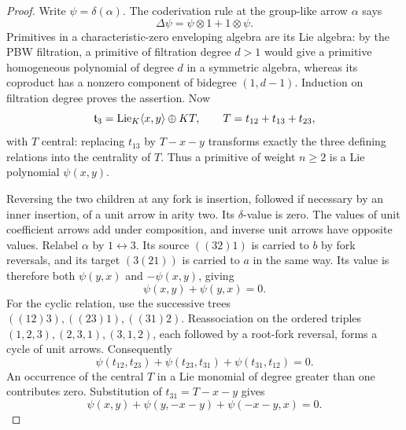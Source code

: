 \begin{proof}
Write $\psi=\delta(\alpha)$.  The coderivation rule at the group-like
arrow $\alpha$ says
\[
 \Delta\psi=\psi\otimes1+1\otimes\psi.
\]
Primitives in a characteristic-zero enveloping algebra are its Lie
algebra: by the PBW filtration, a primitive of filtration degree
$d>1$ would give a primitive homogeneous polynomial of degree $d$ in a
symmetric algebra, whereas its coproduct has a nonzero component of
bidegree $(1,d-1)$.  Induction on filtration degree proves the assertion.
Now
\begin{equation}\label{eq:category-three-split}
 \mathfrak t_3=\operatorname{Lie}_K\langle x,y\rangle\oplus K T,
 \qquad T=t_{12}+t_{13}+t_{23},
\end{equation}
with $T$ central: replacing $t_{13}$ by $T-x-y$ transforms exactly the
three defining relations into the centrality of $T$.  Thus a primitive
of weight $n\geq2$ is a Lie polynomial $\psi(x,y)$.

Reversing the two children at any fork is insertion, followed if
necessary by an inner insertion, of a unit arrow in arity two.  Its
$\delta$-value is zero.  The values of unit coefficient arrows add under
composition, and inverse unit arrows have opposite values.  Relabel
$\alpha$ by $1\leftrightarrow3$.  Its source $((32)1)$ is carried to $b$
by fork reversals, and its target $(3(21))$ is carried to $a$ in the same
way.  Its value is therefore both $\psi(y,x)$ and $-\psi(x,y)$, giving
\begin{equation}\label{eq:category-antisymmetry}
 \psi(x,y)+\psi(y,x)=0.
\end{equation}
For the cyclic relation, use the successive trees
$((12)3),((23)1),((31)2)$.  Reassociation on the ordered triples
$(1,2,3),(2,3,1),(3,1,2)$, each followed by a root-fork reversal,
forms a cycle of unit arrows.  Consequently
\[
 \psi(t_{12},t_{23})+\psi(t_{23},t_{31})+
 \psi(t_{31},t_{12})=0.
\]
An occurrence of the central $T$ in a Lie monomial of degree greater
than one contributes zero.  Substitution of $t_{31}=T-x-y$ gives
\begin{equation}\label{eq:category-cyclic}
 \psi(x,y)+\psi(y,-x-y)+\psi(-x-y,x)=0.
\end{equation}


\end{proof}
